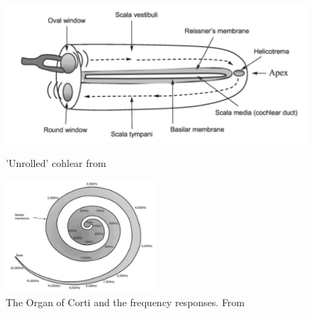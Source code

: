 \documentclass[logo,bsc,singlespacing,parskip,online]{infthesis}
\begin{document}
\begin{figure}[h]
   \centering
   \begin{minipage}{0.4\textwidth}
      \centering
      \includegraphics[width=\textwidth]{wayland-cohlear.png}
      \caption{'Unrolled' cohlear from \citet{Wayland2018Phonetics}}
      \label{fig:cohlear}
   \end{minipage}
   \hfill
   \begin{minipage}{0.48\textwidth}
      \centering
      \includegraphics[width=0.5\textwidth]{wayland-corti-2.png}
      \caption{The Organ of Corti and the frequency responses. From \citet{Wayland2018Phonetics}}
      \label{fig:corti}
   \end{minipage}
\end{figure}

\end{document}
